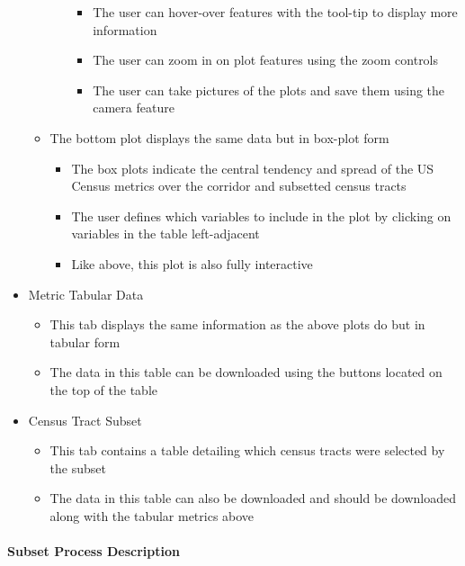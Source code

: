 \documentclass[
]{article}
\providecommand{\tightlist}{%
  \setlength{\itemsep}{0pt}\setlength{\parskip}{0pt}}
\begin{document}
\begin{itemize}
\begin{itemize}
\begin{itemize}
      \begin{itemize}
      \tightlist
      \item
        The user can hover-over features with the tool-tip to display
        more information
      \item
        The user can zoom in on plot features using the zoom controls
      \item
        The user can take pictures of the plots and save them using the
        camera feature
      \end{itemize}
    \end{itemize}
  \item
    The bottom plot displays the same data but in box-plot form

    \begin{itemize}
    \tightlist
    \item
      The box plots indicate the central tendency and spread of the US
      Census metrics over the corridor and subsetted census tracts
    \item
      The user defines which variables to include in the plot by
      clicking on variables in the table left-adjacent
    \item
      Like above, this plot is also fully interactive
    \end{itemize}
  \end{itemize}
\item
  Metric Tabular Data

  \begin{itemize}
  \tightlist
  \item
    This tab displays the same information as the above plots do but in
    tabular form
  \item
    The data in this table can be downloaded using the buttons located
    on the top of the table
  \end{itemize}
\item
  Census Tract Subset

  \begin{itemize}
  \tightlist
  \item
    This tab contains a table detailing which census tracts were
    selected by the subset
  \item
    The data in this table can also be downloaded and should be
    downloaded along with the tabular metrics above
  \end{itemize}
\end{itemize}

\hypertarget{subset-process-description}{%
\paragraph{Subset Process
Description}\label{subset-process-description}}
\end{document}
